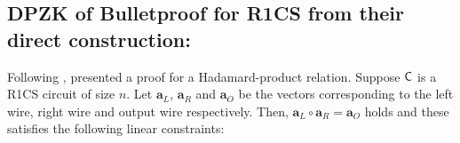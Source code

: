 \begin{comment}
sets $\mathsf{state}$ as fail, otherwise, pass.
Similarly, $\mathsf{state}$ is set for the remaining part of the protocol.
(This part is informally stated here, details will be provided in the full version.)
Now for both the protocols if $\mathsf{state}$ remains pass till the provers send the final messages to $\Ag$, which are the witnesses of the inner product arguments, 
\pnote{Should we add the details such as what are the consistency checks? From the protocol that is quite evident.}
then $\Sim$ calls the functionality $\Func_{\DPZK}$ with the input $\wit, x,y,z$ of the parties in $I$. If it outputs 1, then $\Sim$ generates the final messages of the honest parties using the accepting transcript produced by the zero-knowledge simulator, else $\Sim$ picks any random message which is consistent with the transcript so far.

If there is some inconsistency in some intermediate step, i.e., the $\mathsf{state}$ is fail, then $\Sim$ calls the functionality $\Func_{\DPZK}$ on some random value and proceeds accordingly with the simulation.

This proves that the view of the corrupt provers can be simulated, which ensures privacy of the honest provers.
\end{proof}

\end{comment}
\subsection{DPZK of Bulletproof for R1CS from their direct construction:}\label{app:BulletproofsDPZK}
Following \cite{InnerProductDLS}, \cite{bulletproofs} presented a proof for a Hadamard-product relation. Suppose $\mathsf{C}$ is a R1CS circuit of size $n$. Let $\bm{a}_L$, $\bm{a}_R$ and $\bm{a}_O$ be the vectors corresponding to the left wire, right wire and output wire respectively. Then, $\bm{a}_L \circ \bm{a}_R = \bm{a}_O$ holds and these satisfies the following linear constraints: 

